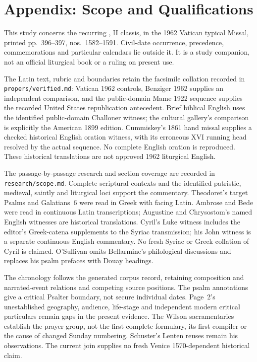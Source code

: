 \sectionguard
\section*{Appendix: Scope and Qualifications}

This study concerns the recurring , II classis, in the 1962 Vatican typical Missal, printed
pp.~396--397, nos.~1582--1591. Civil-date occurrence, precedence,
commemorations and particular calendars lie outside it. It is a study
companion, not an official liturgical book or a ruling on present use.

The Latin text, rubric and boundaries retain the facsimile collation
recorded in \nolinkurl{propers/verified.md}: Vatican 1962 controls,
Benziger 1962 supplies an independent comparison, and the public-domain
Mame 1922 sequence supplies the recorded United States republication
antecedent. Brief biblical English uses the identified public-domain
Challoner witness; the cultural gallery's comparison is explicitly the
American 1899 edition. Cummiskey's 1861 hand missal supplies a checked
historical English oration witness, with its erroneous XVI running head
resolved by the actual sequence. No complete English oration is reproduced.
These historical translations are not approved 1962 liturgical English.

The passage-by-passage research and section coverage are recorded in
\nolinkurl{research/scope.md}. Complete scriptural contexts and the
identified patristic, medieval, saintly and liturgical loci support the
commentary. Theodoret's target Psalms and Galatians~6 were read in Greek
with facing Latin. Ambrose and Bede were read in continuous Latin
transcriptions; Augustine and Chrysostom's named English witnesses are
historical translations. Cyril's Luke witness includes the editor's
Greek-catena supplements to the Syriac transmission; his John witness is
a separate continuous English commentary. No fresh Syriac or Greek
collation of Cyril is claimed. O'Sullivan omits Bellarmine's philological
discussions and replaces his psalm prefaces with Douay headings.

The chronology follows the generated corpus record, retaining composition
and narrated-event relations and competing source positions. The psalm
annotations give a critical Psalter boundary, not secure individual dates.
Page~2's unestablished geography, audience, life-stage and independent modern
critical particulars remain gaps in the present evidence. The Wilson
sacramentaries establish the prayer group, not the first complete formulary,
its first compiler or the cause of changed Sunday numbering. Schuster's
Lenten reuses remain his observations. The current join supplies no fresh
Venice 1570-dependent historical claim.

